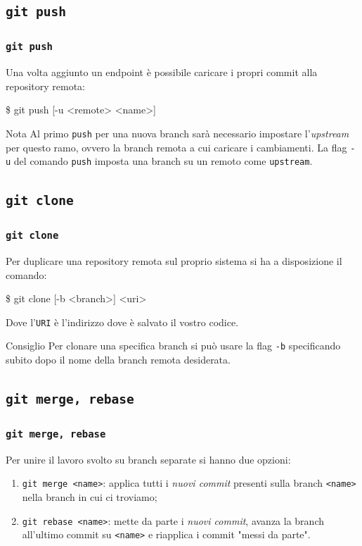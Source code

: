 \documentclass{beamer}
\begin{document}
\subsection{\texttt{git push}}
\begin{frame}
  \frametitle{\texttt{git push}}
  Una volta aggiunto un endpoint \`e possibile caricare i propri commit alla
  repository remota:
  \begin{semiverbatim}
  \$ git push [-u <remote> <name>]
  \end{semiverbatim} \pause
  \begin{block}{Nota}
    Al primo \texttt{push} per una nuova branch sar\`a necessario impostare
    l'\emph{upstream} per questo ramo, ovvero la branch remota a cui caricare i
    cambiamenti. La flag \texttt{-u} del comando \texttt{push} imposta una
    branch su un remoto come \texttt{upstream}.
  \end{block}
\end{frame}

\subsection{\texttt{git clone}}
\begin{frame}
  \frametitle{\texttt{git clone}}
  Per duplicare una repository remota sul proprio sistema si ha a disposizione
  il comando:
  \begin{semiverbatim}
  \$ git clone [-b <branch>] <uri>
  \end{semiverbatim}
  Dove l'\texttt{URI} \`e l'indirizzo dove \`e salvato il vostro codice.
  \pause
  \begin{block}{Consiglio}
    Per clonare una specifica branch si pu\`o usare la flag \texttt{-b}
    specificando subito dopo il nome della branch remota desiderata.
  \end{block}
\end{frame}

\subsection{\texttt{git merge, rebase}}
\begin{frame}
  \frametitle{\texttt{git merge, rebase}}
  Per unire il lavoro svolto su branch separate si hanno due opzioni:
  \begin{enumerate}
    \item<1-> \texttt{git merge <name>}: applica tutti i \emph{nuovi commit}\footnotemark{}
      presenti sulla branch \texttt{<name>} nella branch in cui ci troviamo;
    \item<2-> \texttt{git rebase <name>}: mette da parte i
      \emph{nuovi commit}\footnotemark[\value{footnote}], avanza la branch
      all'ultimo commit su \texttt{<name>} e riapplica i commit "messi da parte".
  \end{enumerate}
\end{frame}
\end{document}
